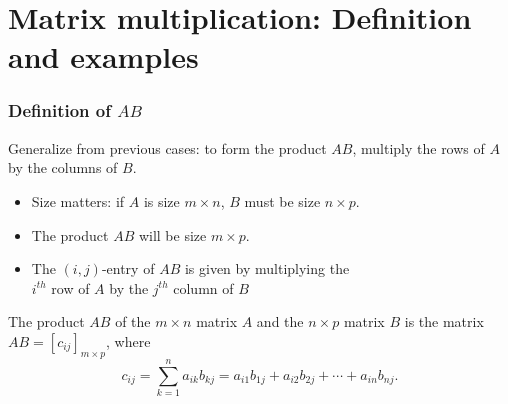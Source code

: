 \documentclass[11pt,t]{beamer}
\begin{document}
\section{Matrix multiplication: Definition and examples}
\begin{frame}\frametitle{Definition of $AB$}
Generalize from previous cases: to form the product $AB$, multiply the \alert{rows} of $A$ by the \alert{columns} of $B$.
\begin{itemize}
\item Size matters: if $A$ is size $m\times n$, $B$ must be size $n\times p$.

\medskip

\item The product $AB$ will be size $m\times p$.

\medskip

\item The $(i,j)$-entry of $AB$ is given by multiplying the\\
\alert{$i^{th}$ row of $A$} by the \alert{$j^{th}$ column of $B$}
\end{itemize}
\begin{definition}
The \alert{product} $AB$ of the $m\times n$ matrix $A$ and the $n\times p$ matrix $B$ is the matrix $AB = [c_{ij}]_{m\times p}$, where
\[
c_{ij} = \sum_{k=1}^na_{ik}b_{kj} = a_{i1}b_{1j}+a_{i2}b_{2j}+\cdots + a_{in}b_{nj}.
\]
\end{definition}
\end{frame}
\end{document}
